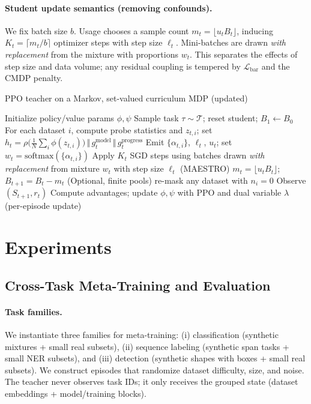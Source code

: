 \documentclass[11pt]{article}
\newcommand{\1}{\mathbf{1}}
\newcommand{\MAESTRO}{\textsc{MAESTRO}\xspace}
\begin{document}
\paragraph{Student update semantics (removing confounds).}
We fix batch size $b$.
Usage chooses a sample count $m_t=\lfloor u_t B_t\rfloor$, inducing $K_t=\lceil m_t/b\rceil$ optimizer steps with step size $\ell_t$.
Mini-batches are drawn \emph{with replacement} from the mixture with proportions $w_t$.
This separates the effects of step size and data volume; any residual coupling is tempered by $\mathcal{L}_{\text{bar}}$ and the CMDP penalty.

\begin{algorithm}[H]
\caption{PPO teacher on a Markov, set-valued curriculum MDP (updated)}
\label{alg:ppo}
\begin{algorithmic}[1]
\State Initialize policy/value params $\phi,\psi$
    \State Sample task $\tau\sim\mathcal{T}$; reset student; $B_1\leftarrow B_0$
      \State {}
      \State For each dataset $i$, compute probe statistics and $z_{t,i}$; set $h_t=\rho\!\big(\tfrac{1}{N}\sum_i \phi(z_{t,i})\big)\,\Vert\,g^{\text{model}}_t\,\Vert\,g^{\text{progress}}_t$
      \State Emit $\{\alpha_{t,i}\}$, $\ell_t$, $u_t$; set $w_t=\mathrm{softmax}(\{\alpha_{t,i}\})$
      \State Apply $K_t$ SGD steps using batches drawn \emph{with replacement} from mixture $w_t$ with step size $\ell_t$ (\MAESTRO{})
      \State $m_t=\lfloor u_t B_t\rfloor$;\quad $B_{t+1}=B_t-m_t$
      \State (Optional, finite pools) re-mask any dataset with $n_i=0$
      \State Observe $(S_{t+1}, r_t)$
    \EndFor
  \EndFor
  \State Compute advantages; update $\phi,\psi$ with PPO and dual variable $\lambda$ (per-episode update)
\EndFor
\end{algorithmic}
\end{algorithm}

\section{Experiments}
\subsection{Cross-Task Meta-Training and Evaluation}
\paragraph{Task families.}
We instantiate three families for meta-training: (i) classification (synthetic mixtures + small real subsets), (ii) sequence labeling (synthetic span tasks + small NER subsets), and (iii) detection (synthetic shapes with boxes + small real subsets). 
We construct episodes that randomize dataset difficulty, size, and noise. 
The teacher never observes task IDs; it only receives the grouped state (dataset embeddings + model/training blocks).
\end{document}
